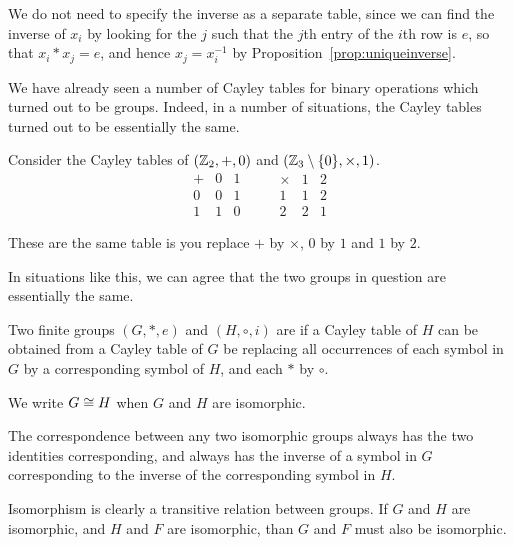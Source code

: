 We do not need to specify the inverse as a separate table, since we can find
the inverse of $x_{i}$ by looking for the $j$ such that the $j$th entry of the
$i$th row is $e$, so that $x_{i} \ast x_{j} = e$, and hence $x_{j} = x_{i}^{-1}$
by Proposition~\ref{prop:uniqueinverse}.

We have already seen a number of Cayley tables for binary operations which
turned out to be groups.  Indeed, in a number of situations, the Cayley tables
turned out to be essentially the same.

\begin{example}
  Consider the Cayley tables of $(\mathbb{Z}_{2}, +, 0)$ and $(\mathbb{Z}_{3}
  \setminus \{0\}, \times, 1)$.
  \[
    \begin{array}{c|cc}
      + & 0 & 1 \\
      \hline
      0 & 0 & 1 \\
      1 & 1 & 0
    \end{array}
    \qquad
    \begin{array}{c|cc}
      \times & 1 & 2 \\
      \hline
      1 & 1 & 2 \\
      2 & 2 & 1
    \end{array}
  \]
  
  These are the same table is you replace $+$ by $\times$, $0$ by $1$ and $1$
  by $2$.
\end{example}

In situations like this, we can agree that the two groups in question are
essentially the same.

\begin{definition}
  Two finite groups $(G, \ast, e)$ and $(H, \circ, i)$ are
   if a Cayley table of $H$ can be obtained
  from a Cayley table of $G$ be replacing all occurrences of each symbol
  in $G$ by a corresponding symbol of $H$, and each $\ast$ by $\circ$.
  
  We write $G \cong H$ when $G$ and $H$ are isomorphic.
\end{definition}

The correspondence between any two isomorphic groups always has the two
identities corresponding, and always has the inverse of a symbol in $G$
corresponding to the inverse of the corresponding symbol in $H$.

Isomorphism is clearly a transitive relation between groups.  If $G$ and $H$
are isomorphic, and $H$ and $F$ are isomorphic, than $G$ and $F$ must also be
isomorphic.


